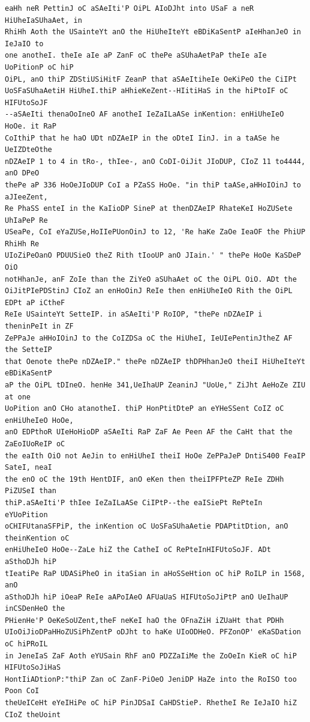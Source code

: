 \documentclass[12pt,a4paper]{article}
\begin{document}
\begin{lstlisting}[caption={Complete text after iteration 5}, label={lst:iter5}]
eaHh neR PettinJ oC aSAeIti'P OiPL AIoDJht into USaF a neR HiUheIaSUhaAet, in
RhiHh Aoth the USainteYt anO the HiUheIteYt eBDiKaSentP aIeHhanJeO in IeJaIO to
one anotheI. theIe aIe aP ZanF oC thePe aSUhaAetPaP theIe aIe UoPitionP oC hiP
OiPL, anO thiP ZDStiUSiHitF ZeanP that aSAeItiheIe OeKiPeO the CiIPt
UoSFaSUhaAetiH HiUheI.thiP aHhieKeZent--HIitiHaS in the hiPtoIF oC HIFUtoSoJF
--aSAeIti thenaOoIneO AF anotheI IeZaILaASe inKention: enHiUheIeO HoOe. it RaP
CoIthiP that he haO UDt nDZAeIP in the oDteI IinJ. in a taASe he UeIZDteOthe
nDZAeIP 1 to 4 in tRo-, thIee-, anO CoDI-OiJit JIoDUP, CIoZ 11 to4444, anO DPeO
thePe aP 336 HoOeJIoDUP CoI a PZaSS HoOe. "in thiP taASe,aHHoIOinJ to aJIeeZent,
Re PhaSS enteI in the KaIioDP SineP at thenDZAeIP RhateKeI HoZUSete UhIaPeP Re
USeaPe, CoI eYaZUSe,HoIIePUonOinJ to 12, 'Re haKe ZaOe IeaOF the PhiUP RhiHh Re
UIoZiPeOanO PDUUSieO theZ Rith tIooUP anO JIain.' " thePe HoOe KaSDeP OiO
notHhanJe, anF ZoIe than the ZiYeO aSUhaAet oC the OiPL OiO. ADt the
OiJitPIePDStinJ CIoZ an enHoOinJ ReIe then enHiUheIeO Rith the OiPL EDPt aP iCtheF
ReIe USainteYt SetteIP. in aSAeIti'P RoIOP, "thePe nDZAeIP i theninPeIt in ZF
ZePPaJe aHHoIOinJ to the CoIZDSa oC the HiUheI, IeUIePentinJtheZ AF the SetteIP
that Oenote thePe nDZAeIP." thePe nDZAeIP thDPHhanJeO theiI HiUheIteYt eBDiKaSentP
aP the OiPL tDIneO. henHe 341,UeIhaUP ZeaninJ "UoUe," ZiJht AeHoZe ZIU at one
UoPition anO CHo atanotheI. thiP HonPtitDteP an eYHeSSent CoIZ oC enHiUheIeO HoOe,
anO EDPthoR UIeHoHioDP aSAeIti RaP ZaF Ae Peen AF the CaHt that the ZaEoIUoReIP oC
the eaIth OiO not AeJin to enHiUheI theiI HoOe ZePPaJeP DntiS400 FeaIP SateI, neaI
the enO oC the 19th HentDIF, anO eKen then theiIPFPteZP ReIe ZDHh PiZUSeI than
thiP.aSAeIti'P thIee IeZaILaASe CiIPtP--the eaISiePt RePteIn eYUoPition
oCHIFUtanaSFPiP, the inKention oC UoSFaSUhaAetie PDAPtitDtion, anO theinKention oC
enHiUheIeO HoOe--ZaLe hiZ the CatheI oC RePteInHIFUtoSoJF. ADt aSthoDJh hiP
tIeatiPe RaP UDASiPheO in itaSian in aHoSSeHtion oC hiP RoILP in 1568, anO
aSthoDJh hiP iOeaP ReIe aAPoIAeO AFUaUaS HIFUtoSoJiPtP anO UeIhaUP inCSDenHeO the
PHienHe'P OeKeSoUZent,theF neKeI haO the OFnaZiH iZUaHt that PDHh
UIoOiJioDPaHHoZUSiPhZentP oDJht to haKe UIoODHeO. PFZonOP' eKaSDation oC hiPRoIL
in JeneIaS ZaF Aoth eYUSain RhF anO PDZZaIiMe the ZoOeIn KieR oC hiP HIFUtoSoJiHaS
HontIiADtionP:"thiP Zan oC ZanF-PiOeO JeniDP HaZe into the RoISO too Poon CoI
theUeICeHt eYeIHiPe oC hiP PinJDSaI CaHDStieP. RhetheI Re IeJaIO hiZ CIoZ theUoint

\end{lstlisting}
\end{document}
